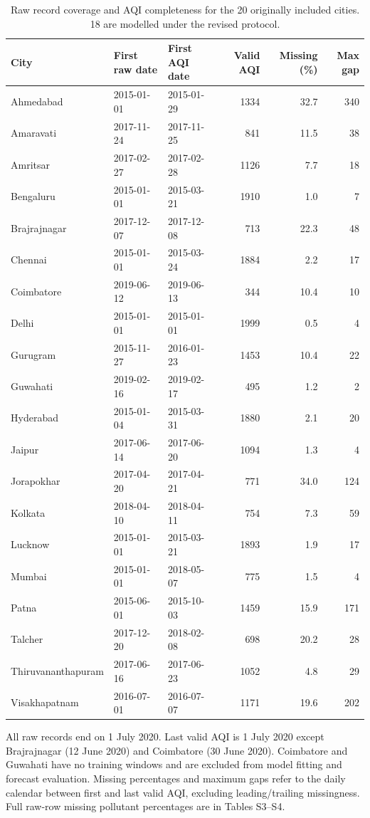 \begin{table}[!htbp]
\centering
\caption{Raw record coverage and AQI completeness for the 20 originally included cities. 18 are modelled under the revised protocol.}\label{tab:coverage}
\setlength{\tabcolsep}{4pt}
\begin{tabular}{lllrrr}
\toprule
City & First raw date & First AQI date & Valid AQI & Missing (\%) & Max gap \\
\midrule
Ahmedabad & 2015-01-01 & 2015-01-29 & 1334 & 32.7 & 340 \\
Amaravati & 2017-11-24 & 2017-11-25 & 841 & 11.5 & 38 \\
Amritsar & 2017-02-27 & 2017-02-28 & 1126 & 7.7 & 18 \\
Bengaluru & 2015-01-01 & 2015-03-21 & 1910 & 1.0 & 7 \\
Brajrajnagar & 2017-12-07 & 2017-12-08 & 713 & 22.3 & 48 \\
Chennai & 2015-01-01 & 2015-03-24 & 1884 & 2.2 & 17 \\
Coimbatore & 2019-06-12 & 2019-06-13 & 344 & 10.4 & 10 \\
Delhi & 2015-01-01 & 2015-01-01 & 1999 & 0.5 & 4 \\
Gurugram & 2015-11-27 & 2016-01-23 & 1453 & 10.4 & 22 \\
Guwahati & 2019-02-16 & 2019-02-17 & 495 & 1.2 & 2 \\
Hyderabad & 2015-01-04 & 2015-03-31 & 1880 & 2.1 & 20 \\
Jaipur & 2017-06-14 & 2017-06-20 & 1094 & 1.3 & 4 \\
Jorapokhar & 2017-04-20 & 2017-04-21 & 771 & 34.0 & 124 \\
Kolkata & 2018-04-10 & 2018-04-11 & 754 & 7.3 & 59 \\
Lucknow & 2015-01-01 & 2015-03-21 & 1893 & 1.9 & 17 \\
Mumbai & 2015-01-01 & 2018-05-07 & 775 & 1.5 & 4 \\
Patna & 2015-06-01 & 2015-10-03 & 1459 & 15.9 & 171 \\
Talcher & 2017-12-20 & 2018-02-08 & 698 & 20.2 & 28 \\
Thiruvananthapuram & 2017-06-16 & 2017-06-23 & 1052 & 4.8 & 29 \\
Visakhapatnam & 2016-07-01 & 2016-07-07 & 1171 & 19.6 & 202 \\
\bottomrule
\end{tabular}
\par\smallskip\begin{minipage}{0.98\linewidth}\footnotesize All raw records end on 1 July 2020. Last valid AQI is 1 July 2020 except Brajrajnagar (12 June 2020) and Coimbatore (30 June 2020). Coimbatore and Guwahati have no training windows and are excluded from model fitting and forecast evaluation. Missing percentages and maximum gaps refer to the daily calendar between first and last valid AQI, excluding leading/trailing missingness. Full raw-row missing pollutant percentages are in Tables S3--S4.\end{minipage}
\end{table}
